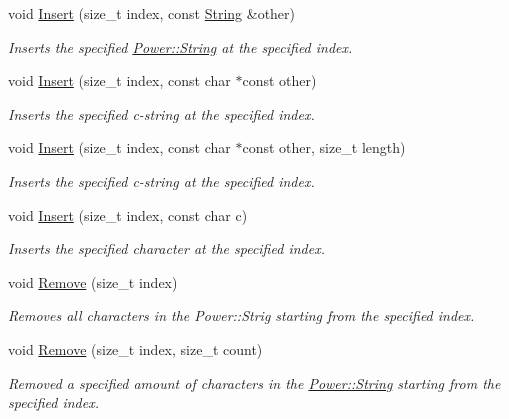 \begin{DoxyCompactItemize}
void \hyperlink{class_power_1_1_string_ae299096a84ec36c3a7d334ecbd98c8ac}{Insert} (size\+\_\+t index, const \hyperlink{class_power_1_1_string}{String} \&other)
\begin{DoxyCompactList}\small\item\em Inserts the specified \hyperlink{class_power_1_1_string}{Power\+::\+String} at the specified index. \end{DoxyCompactList}\item 
void \hyperlink{class_power_1_1_string_aae39de09c7d011d58c067545cbec254a}{Insert} (size\+\_\+t index, const char $\ast$const other)
\begin{DoxyCompactList}\small\item\em Inserts the specified c-\/string at the specified index. \end{DoxyCompactList}\item 
void \hyperlink{class_power_1_1_string_a9f13e94b3e64c51f1c3d809f2ac34b47}{Insert} (size\+\_\+t index, const char $\ast$const other, size\+\_\+t length)
\begin{DoxyCompactList}\small\item\em Inserts the specified c-\/string at the specified index. \end{DoxyCompactList}\item 
void \hyperlink{class_power_1_1_string_a07dc9c5bdb8dfc2dff7a49d5464b1017}{Insert} (size\+\_\+t index, const char c)
\begin{DoxyCompactList}\small\item\em Inserts the specified character at the specified index. \end{DoxyCompactList}\item 
void \hyperlink{class_power_1_1_string_a74417c6d558225c4bbd8e51128dc64fc}{Remove} (size\+\_\+t index)
\begin{DoxyCompactList}\small\item\em Removes all characters in the Power\+::\+Strig starting from the specified index. \end{DoxyCompactList}\item 
void \hyperlink{class_power_1_1_string_ae54d14f87fd2d2e66334697ea1a740a7}{Remove} (size\+\_\+t index, size\+\_\+t count)
\begin{DoxyCompactList}\small\item\em Removed a specified amount of characters in the \hyperlink{class_power_1_1_string}{Power\+::\+String} starting from the specified index. \end{DoxyCompactList}\item 

\end{DoxyCompactItemize}
